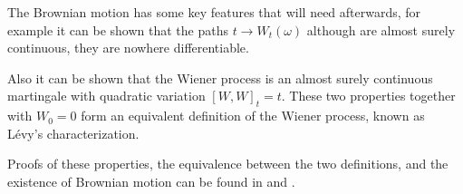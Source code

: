 The Brownian motion has some key features that will need afterwards,
for example it can be shown that the paths $t \rightarrow W_t(\omega)$ although are almost surely continuous,
they are nowhere differentiable.

Also it can be shown that the Wiener process is an almost surely continuous martingale
with quadratic variation $[W, W]_t = t$.
These two properties together with $W_0 = 0$ form an equivalent definition of the Wiener process,
known as Lévy's characterization.

Proofs of these properties, the equivalence between the two definitions,
and the existence of Brownian motion can be found in \cite{morters_peres_brownian_motion}
and \cite[Ch.~2]{oksendal_sde}.
